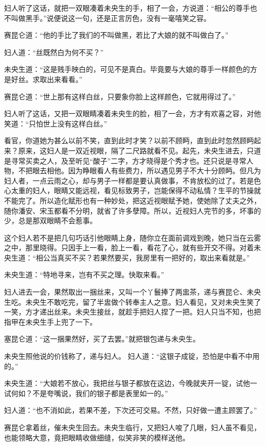\documentclass[a4paper,12pt,UTF8,twoside]{ctexbook}
\begin{document}
妇人听了这话，就把一双眼凑着未央生的手，相了一会，方说道：“相公的尊手也不叫做黑手。”说便说这一句，还是正言厉色，没有一毫嘻笑之容。

赛昆仑道：“他的手比了我们的不叫做黑，若比了大娘的就不叫做白了。”

妇人道：“丝既然白为何不买？”

未央生道：“这是贱手映白的，可见不是真白。毕竟要与大娘的尊手一样颜色的方是好丝。求取出来看看。”

赛昆仑道：“世上那有这样白丝，只要象你脸上这样颜色，它就用得过了。”

妇人听了这话，又把一双眼睛凑着未央生的脸，相了一会，方才有欢喜之容，对他笑道：“只怕世上没有这样白丝。”

看官，你道她为甚么以前不笑，直到此时才笑？以前不顾眄，直到此时忽然顾眄起来？原来，这妇人是一双近视眼，隔了二尺路就看不见。起先，未央生进去，只道是寻常买卖之人，及至听见“酸子”二字，方才晓得是个秀才也。还只说是寻常人物，不把眼去相他。因为睁眼看人有些费力，所以遇见男子不大十分顾眄。但凡为妇人者，一点云雨之心，却与男子一样都是要认真做事，不肯放松的过了。若是色心太重的妇人，眼睛又能远视，看见标致男子，岂能保得不动私情？生平的节操就不能完了。所以造化赋形也有一种妙处，把这近视眼赋予她，使她除了丈夫之外，随你潘安、宋玉都看不分明，就省了许多孽障。所以，近视妇人完节的多，坏事的少，总是那双眼睛不会惹事。

这个妇人若不是把几句巧话引他眼睛上身，随你立在面前调戏到晚，她只当在云雾之中，那里晓得。只因手上一看，脸上一看，看花了心，就有些开交不得。对着未央生道：“相公当真买不买？若果然要买，我房里有一把好的，取出来看就是。”

未央生道：“特地寻来，岂有不买之理。快取来看。”

妇人进去一会，果然取出一捆丝来，又叫一个丫鬟捧了两盅茶，递与赛昆仑、未央生吃。未央生不敢吃完，留了半盅做个转奉主人之意。妇人看见，又对未央生笑了一笑，方才递出丝来。未央生接丝，就趁手把妇人捏了一把。妇人只当不知，也把指甲在未央生手上兜了一下。

塞昆仑道：“这一捆果然好，买了去罢。”就把银包递与未央生。

未央生照他说的价钱称了，递与妇人。 妇人道：“这银子成锭，恐怕是中看不中用的。”

未央生道：“大娘若不放心，我把丝与银子都放在这边，今晚就夹开一锭，试他一试何如？不是夸嘴说，我们的银子都是表里如一的。”

妇人道：“也不消如此，若果不差，下次还可交易。不然，只好做一遭主顾罢了。”

赛昆仑拿着丝，催未央生回去。未央生临行，又把妇人唆了几眼，妇人虽不看见，也能领略大意，竟把眼睛收做细缝，似笑非笑的模样送他。
\end{document}

